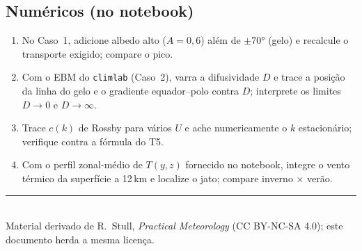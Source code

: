 \documentclass[11pt]{article}
\begin{document}
\subsection*{Numéricos (no notebook)}

\begin{enumerate}[label=\textbf{N\arabic*.},itemsep=4pt]
  \item No Caso~1, adicione albedo alto ($A = 0{,}6$) além de $\pm70°$
        (gelo) e recalcule o transporte exigido; compare o pico.
  \item Com o EBM do \texttt{climlab} (Caso~2), varra a difusividade $D$
        e trace a posição da linha do gelo e o gradiente equador--polo
        contra $D$; interprete os limites $D\to0$ e $D\to\infty$.
  \item Trace $c(k)$ de Rossby para vários $U$ e ache numericamente o
        $k$ estacionário; verifique contra a fórmula do T5.
  \item Com o perfil zonal-médio de $T(y, z)$ fornecido no notebook,
        integre o vento térmico da superfície a 12\,km e localize o
        jato; compare inverno × verão.
\end{enumerate}

\vspace{1em}
\noindent\rule{\linewidth}{0.4pt}\\
{\scriptsize Material derivado de R.~Stull, \emph{Practical Meteorology}
(CC BY-NC-SA 4.0); este documento herda a mesma licença.}
\end{document}
